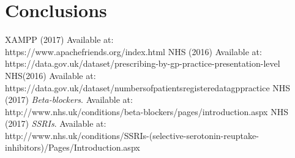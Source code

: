 \documentclass{report}
\begin{document}
\chapter{Conclusions}

\listoflistings
{}
\begin{thebibliography}{9}
		XAMPP (2017)
		Available at: \\https://www.apachefriends.org/index.html
		NHS (2016)
		Available at: \\https://data.gov.uk/dataset/prescribing-by-gp-practice-presentation-level
		NHS(2016)
		Available at: \\{https://data.gov.uk/dataset/numbers\textunderscore of\textunderscore patients\textunderscore registered\textunderscore at\textunderscore a\textunderscore gp\textunderscore practice}
		NHS (2017)
		\textit{Beta-blockers}.
		Available at: \\{http://www.nhs.uk/conditions/beta-blockers/pages/introduction.aspx}
		NHS (2017)
		\textit{SSRIs}.
		Available at: \\{http://www.nhs.uk/conditions/SSRIs-(selective-serotonin-reuptake-inhibitors)/Pages/Introduction.aspx}
\end{thebibliography}
\end{document}
